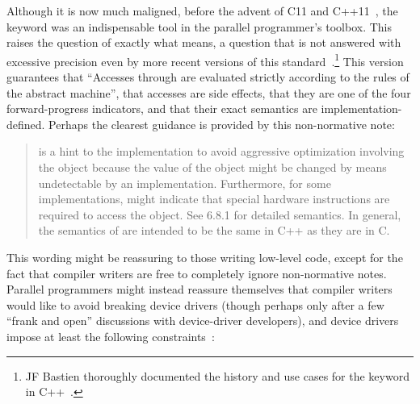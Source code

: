 Although it is now much maligned, before the advent of C11 and
C++11~\cite{PeteBecker2011N3242}, the  keyword was an
indispensable tool in the parallel programmer's toolbox.
This raises the question of exactly what  means,
a question that is not answered with excessive precision even
by more recent versions of this standard~\cite{RichardSmith2019N4800}.\footnote{
	JF Bastien thoroughly documented the history and use cases
	for the  keyword in
	C++~\cite{JFBastien2018DeprecatingVolatile}.}
This version guarantees that ``Accesses through 
 are evaluated strictly according to the rules of the
abstract machine'',
that  accesses are side effects,
that they are one of the four forward-progress indicators,
and that their exact semantics are implementation-defined.
Perhaps the clearest guidance is provided by this non-normative note:

\begin{quote}
	 is a hint to the implementation to avoid
	aggressive optimization involving the object because the value
	of the object might be changed by means undetectable by an
	implementation.
	Furthermore, for some implementations,  might indicate
	that special hardware instructions are required to access
	the object.
	See 6.8.1 for detailed semantics.
	In general, the semantics of  are intended to be the
	same in C++ as they are in C.
\end{quote}

This wording might be reassuring to those writing low-level code, except
for the fact that compiler writers are free to completely ignore
non-normative notes.
Parallel programmers might instead reassure themselves that compiler
writers would like to avoid breaking device drivers (though perhaps
only after a few ``frank and open'' discussions with device-driver
developers), and device drivers impose at least the following
constraints~\cite{PaulEMcKenney2016P0124R6-LKMM}:

